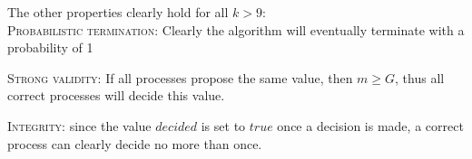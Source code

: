 \documentclass{article}
\begin{document}
\begin{enumerate}[a)]
        The other properties clearly hold for all $k > 9$:\\
        \textsc{Probabilistic termination:} Clearly the algorithm will eventually terminate with a probability of 1

        \textsc{Strong validity:} If all processes propose the same value, then $m \geq G$, thus all correct processes will decide this value.

        \textsc{Integrity:} since the value $decided$ is set to $true$ once a decision is made, a correct process can clearly decide no more than once.
    \end{enumerate}
    
    
\end{document}
